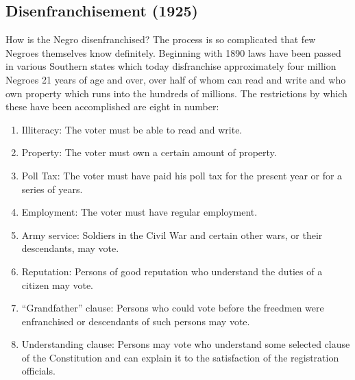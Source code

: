 \documentclass[letterpaper,10pt,english]{jupyterBook}
\begin{document}
\subsection{Disenfranchisement (1925)}
\label{\detokenize{Volumes/30/02/disenfranchisement:disenfranchisement-1925}}\label{\detokenize{Volumes/30/02/disenfranchisement::doc}}
\sphinxAtStartPar
How is the Negro disenfranchised? The process is so complicated that few Negroes themselves know definitely. Beginning with 1890 laws have been passed in various Southern states which today disfranchise approximately four million Negroes 21 years of age and over, over half of whom can read and write and who own property which runs into the hundreds of millions. The restrictions by which these have been accomplished are eight in number:
\begin{enumerate}
%
\item {} 
\sphinxAtStartPar
Illiteracy: The voter must be able to read and write.

\item {} 
\sphinxAtStartPar
Property: The voter must own a certain amount of property.

\item {} 
\sphinxAtStartPar
Poll Tax: The voter must have paid his poll tax for the present year or for a series of years.

\item {} 
\sphinxAtStartPar
Employment: The voter must have regular employment.

\item {} 
\sphinxAtStartPar
Army service: Soldiers in the Civil War and certain other wars, or their descendants, may vote.

\item {} 
\sphinxAtStartPar
Reputation: Persons of good reputation who understand the duties of a citizen may vote.

\item {} 
\sphinxAtStartPar
“Grandfather” clause: Persons who could vote before the freedmen were enfranchised or descendants of such persons may vote.

\item {} 
\sphinxAtStartPar
Understanding clause: Persons may vote who understand some selected clause of the Constitution and can explain it to the satisfaction of the registration officials.

\end{enumerate}
\end{document}
